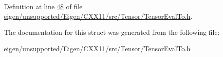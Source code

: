 Definition at line \hyperlink{eigen_2unsupported_2_eigen_2_c_x_x11_2src_2_tensor_2_tensor_eval_to_8h_source_l00048}{48} of file \hyperlink{eigen_2unsupported_2_eigen_2_c_x_x11_2src_2_tensor_2_tensor_eval_to_8h_source}{eigen/unsupported/\+Eigen/\+C\+X\+X11/src/\+Tensor/\+Tensor\+Eval\+To.\+h}.



The documentation for this struct was generated from the following file\+:\begin{DoxyCompactItemize}
\item 
eigen/unsupported/\+Eigen/\+C\+X\+X11/src/\+Tensor/\+Tensor\+Eval\+To.\+h\end{DoxyCompactItemize}
